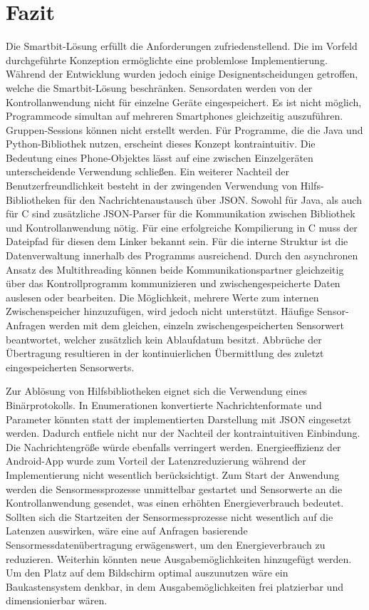 \documentclass[11pt,a4paper]{report}
\begin{document}
\chapter{Fazit}\label{chap:fazit}
Die Smartbit-Lösung erfüllt die Anforderungen zufriedenstellend.
Die im Vorfeld durchgeführte Konzeption ermöglichte eine problemlose Implementierung.
Während der Entwicklung wurden jedoch einige Designentscheidungen getroffen, welche die Smartbit-Lösung beschränken.
Sensordaten werden von der Kontrollanwendung nicht für einzelne Geräte eingespeichert.
Es ist nicht möglich, Programmcode simultan auf mehreren Smartphones gleichzeitig auszuführen.
Gruppen-Sessions können nicht erstellt werden.
Für Programme, die die Java und Python-Bibliothek nutzen, erscheint dieses Konzept kontraintuitiv.
Die Bedeutung eines Phone-Objektes lässt auf eine zwischen Einzelgeräten unterscheidende Verwendung schließen.
Ein weiterer Nachteil der Benutzerfreundlichkeit besteht in der zwingenden Verwendung von Hilfs-Bibliotheken für den Nachrichtenaustausch über JSON.
Sowohl für Java, als auch für C sind zusätzliche JSON-Parser für die Kommunikation zwischen Bibliothek und Kontrollanwendung nötig.
Für eine erfolgreiche Kompilierung in C muss der Dateipfad für diesen dem Linker bekannt sein.
Für die interne Struktur ist die Datenverwaltung innerhalb des Programms ausreichend.
Durch den asynchronen Ansatz des Multithreading können beide Kommunikationspartner gleichzeitig über das Kontrollprogramm kommunizieren und zwischengespeicherte Daten auslesen oder bearbeiten.
Die Möglichkeit, mehrere Werte zum internen Zwischenspeicher hinzuzufügen, wird jedoch nicht unterstützt.
Häufige Sensor-Anfragen werden mit dem gleichen, einzeln zwischengespeicherten Sensorwert beantwortet, welcher zusätzlich kein Ablaufdatum besitzt.
Abbrüche der Übertragung resultieren in der kontinuierlichen Übermittlung des zuletzt eingespeicherten Sensorwerts.

Zur Ablösung von Hilfsbibliotheken eignet sich die Verwendung eines Binärprotokolls.
In Enumerationen konvertierte Nachrichtenformate und Parameter könnten statt der implementierten Darstellung mit JSON eingesetzt werden.
Dadurch entfiele nicht nur der Nachteil der kontraintuitiven Einbindung.
Die Nachrichtengröße würde ebenfalls verringert werden.
Energieeffizienz der Android-App wurde zum Vorteil der Latenzreduzierung während der Implementierung nicht wesentlich berücksichtigt.
Zum Start der Anwendung werden die Sensormessprozesse unmittelbar gestartet und Sensorwerte an die Kontrollanwendung gesendet, was einen erhöhten Energieverbrauch bedeutet.
Sollten sich die Startzeiten der Sensormessprozesse nicht wesentlich auf die Latenzen auswirken, wäre eine auf Anfragen basierende Sensormessdatenübertragung erwägenswert, um den Energieverbrauch zu reduzieren.
Weiterhin könnten neue Ausgabemöglichkeiten hinzugefügt werden.
Um den Platz auf dem Bildschirm optimal auszunutzen wäre ein Baukastensystem denkbar, in dem Ausgabemöglichkeiten frei platzierbar und dimensionierbar wären.
\end{document}
